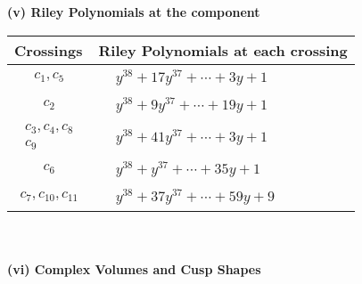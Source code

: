 \documentclass[1p]{elsarticle_modified}
\theoremstyle{definition}
\begin{document}
\newpage\renewcommand{\arraystretch}{1}
\flushleft \textbf{(v) Riley Polynomials at the component}\newline \\
\begin{tabular}{m{50pt}|m{274pt}}
Crossings & \hspace{64pt}Riley Polynomials at each crossing \\
\hline $$\begin{aligned}c_{1},c_{5}\end{aligned}$$&$\begin{aligned}
&y^{38}+17 y^{37}+\cdots+3 y+1
\end{aligned}$\\
\hline $$\begin{aligned}c_{2}\end{aligned}$$&$\begin{aligned}
&y^{38}+9 y^{37}+\cdots+19 y+1
\end{aligned}$\\
\hline $$\begin{aligned}c_{3},c_{4},c_{8}\\c_{9}\end{aligned}$$&$\begin{aligned}
&y^{38}+41 y^{37}+\cdots+3 y+1
\end{aligned}$\\
\hline $$\begin{aligned}c_{6}\end{aligned}$$&$\begin{aligned}
&y^{38}+y^{37}+\cdots+35 y+1
\end{aligned}$\\
\hline $$\begin{aligned}c_{7},c_{10},c_{11}\end{aligned}$$&$\begin{aligned}
&y^{38}+37 y^{37}+\cdots+59 y+9
\end{aligned}$\\
\hline
\end{tabular}\\~\\
\newpage\flushleft \textbf{(vi) Complex Volumes and Cusp Shapes}
\end{document}
